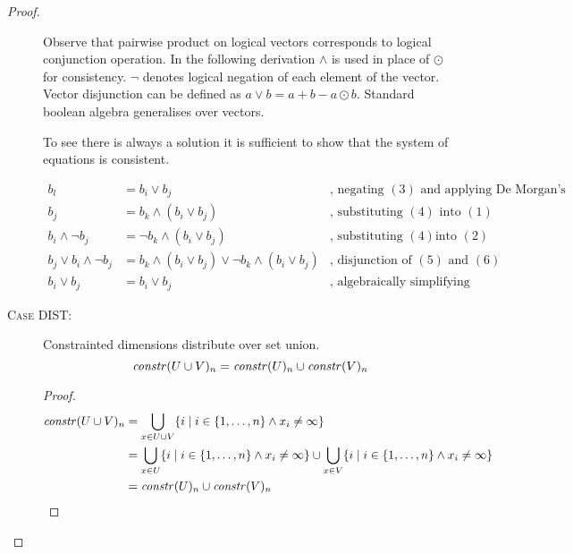 \begin{proof}
\begin{description}
    Observe that pairwise product on logical vectors corresponds to logical
    conjunction operation. In the following derivation $\wedge$ is used in place
    of $\odot$ for consistency. $\neg$ denotes logical negation of each element
    of the vector. Vector disjunction can be defined as $a \vee b = a + b - a
    \odot b$. Standard boolean algebra generalises over vectors.

    To see there is always a solution it is sufficient to show that the system
    of equations is consistent.

    \begin{align}
      b_l &= b_i \vee b_j & \mbox{, negating $(3)$ and applying De Morgan's law} \\
      b_j &= b_k \wedge (b_i \vee b_j) & \mbox{, substituting $(4)$ into $(1)$} \\
      b_i \wedge \neg b_j &= \neg b_k \wedge (b_i \vee b_j) & \mbox{, substituting $(4)$
        into $(2)$} \\
      b_j \vee b_i \wedge \neg b_j &= b_k \wedge (b_i \vee b_j) \vee \neg b_k \wedge (b_i \vee b_j) & \mbox{, disjunction of $(5)$ and $(6)$} \\
      b_i \vee b_j &= b_i \vee b_j & \mbox{, algebraically simplifying (7)} \nonumber
    \end{align}



  \item[\textsc{Case DIST}:]
    \begin{lemma}\label{lem:effdims}
      Constrainted dimensions distribute over set union.
      $$\mathit{constr}(U \cup V)_{n} = \mathit{constr}(U)_{n} \cup \mathit{constr}(V)_{n}$$
    \end{lemma}

    \begin{proof}
      \begin{align*}
        \mathit{constr}(U \cup V)_{n} &= \bigcup_{x \in U \cup V} \{ i \; | \; i \in \{1, \ldots, n\} \wedge x_i \neq \infty \} \\
        &= \bigcup_{x \in U} \{ i \; | \; i \in \{1, \ldots, n\} \wedge x_i \neq \infty \} \cup
           \bigcup_{x \in V} \{ i \; | \; i \in \{1, \ldots, n\} \wedge x_i \neq \infty \} \\
        &= \mathit{constr}(U)_{n} \cup \mathit{constr}(V)_{n} \\
      \end{align*}
    \end{proof}


\end{description}
\end{proof}
